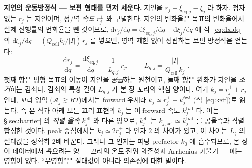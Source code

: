 \documentclass[11pt,a4paper]{article}
\newcommand{\dd}{\mathrm{d}}
\newcommand{\eff}{\mathrm{eff}}
\newcommand{\eq}{\mathrm{eq}}
\newcommand{\cell}{\mathrm{cell}}
\begin{document}
\textbf{지연의 운동방정식 — 보편 형태를 먼저 세운다.} 지연을 $r_j\equiv\xi_{\eq,j}-\xi_j$ 라 하자. 첨자 없는
$r_j$ 는 지연이며, 정/역 \emph{속도} $r_j^\pm$ 와 구별한다. 지연의 변화율은 목표의 변화율에서 실제 진행률의
변화율을 뺀 것이므로, $\dd r_j/\dd q=\dd\xi_{\eq,j}/\dd q-\dd\xi_j/\dd q$ 에 식~\eqref{eq:dxidq} 의
$\dd\xi_j/\dd q=(Q_\cell k_j/|I|)\,r_j$ 를 넣으면, 영역 제한 없이 성립하는 보편 방정식을 얻는다:
\begin{equation}
\frac{\dd r_j}{\dd q}=\frac{\dd\xi_{\eq,j}}{\dd q}-\frac{1}{L_{q,j}}\,r_j,\qquad
\boxed{\;L_{q,j}=\frac{|I|}{Q_\cell\,k_j}\;}.
\label{eq:Lq}
\end{equation}
첫째 항은 평형 목표의 이동이 지연을 \emph{공급}하는 원천이고, 둘째 항은 완화가 지연을 \emph{소거}하는 감쇠다.
감쇠의 특성 길이 $L_{q,j}$ 가 본 장 꼬리의 핵심 양이다. 여기 $k_j=r_j^++r_j^-$ 인데, 꼬리 영역
($\mathcal A_j\gtrsim RT$)에서는 forward 우세라 $k_j\simeq r_j^+\equiv k_j^{\mathrm{fwd}}$
(식~\eqref{eq:keff})로 읽는다. 즉 본 식과 아래 모든 꼬리 표현의 $k_j$ 는 이 forward 속도 $k_j^{\mathrm{fwd}}$ 다.
이는 \S\ref{sec:barrier} 의 \emph{직렬 율속} $k_j^\eff$ 와 다른 양으로, $k_j^\eff$ 는
$k_{j,\mathrm{act}}\simeq k_j^{\mathrm{fwd}}$ 를 공율속과 직렬 합성한 것이다. peak 중심에서는
$k_j\simeq2r_j^+$ 라 인자 $2$ 의 차이가 있고, 이 차이는 $L_q$ 의 절대값을 정확히 $2$배 바꾼다. 그러나 그 인자는
피팅 prefactor $k_0$ 에 흡수되므로, 본 장이 데이터에서 뽑으려는 양 — 꼬리의 온도$\cdot$전위 의존성과 Arrhenius
기울기 — 에는 영향이 없다. ``무영향''은 절대값이 아니라 의존성에 대한 말이다.
\end{document}
